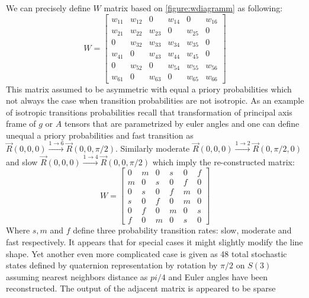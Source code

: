 We can precisely define $W$ matrix based on \ref{figure:wdiagramm} as following: 
\begin{equation}\label{eq:Wmat1}
W = \begin{bmatrix}
       w_{11} & w_{12} & 0 & w_{14} & 0 & w_{16}  \\[0.3em]
       w_{21} & w_{22} & w_{23} & 0 & w_{25} & 0  \\[0.3em]
       0 & w_{32} & w_{33} & w_{34} & w_{35} & 0  \\[0.3em]
       w_{41} & 0 & w_{43} & w_{44} & w_{45} & 0 \\[0.3em]
       0 & w_{52} & 0 & w_{54} & w_{55} & w_{56} \\[0.3em]
       w_{61} & 0 & w_{63} & 0 & w_{65} & w_{66} 
     \end{bmatrix}
\end{equation}
This matrix assumed to be asymmetric with equal a priory probabilities which not always the case when transition probabilities are not isotropic. As an example of isotropic transitions probabilities recall that transformation of principal axis frame of $g$ or $A$ tensors that are parametrized by euler angles and one can define unequal a priory probabilities and fast transition as $\vec{R}(0,0,0)\xrightarrow {1\rightarrow 6}\vec{R}(0,0,\pi/2)$. Similarly moderate $\vec{R}(0,0,0)\xrightarrow {1\rightarrow 2}\vec{R}(0,\pi/2,0)$  and slow $\vec{R}(0,0,0)\xrightarrow {1\rightarrow 4}\vec{R}(0,0,\pi/2)$ which imply the re-constructed matrix:   
\begin{equation}\label{eq:Wmat2}
W = \begin{bmatrix}
       0 & m & 0 & s & 0 & f  \\[0.3em]
       m & 0 & s & 0 & f & 0  \\[0.3em]
       0 & s & 0 & f & m & 0  \\[0.3em]
       s & 0 & f & 0 & m & 0 \\[0.3em]
       0 & f & 0 & m & 0 & s \\[0.3em]
       f & 0 & m & 0 & s & 0 
     \end{bmatrix}
\end{equation}
Where $s,m$ and $f$ define three probability transition rates: slow, moderate and fast respectively. It appears that for special cases it might slightly modify the line shape. Yet another even more complicated case is given as 48 total stochastic states defined by quaternion representation by rotation by $\pi/2$ on $S(3)$ assuming nearest neighbors distance as $pi/4$ and Euler angles have been reconstructed. The output of the adjacent matrix is appeared to be sparse
